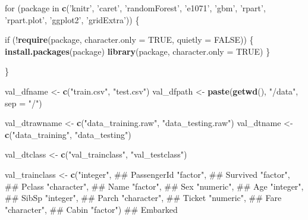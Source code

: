 \documentclass[]{article}
\newenvironment{Shaded}{\begin{snugshade}}{\end{snugshade}}
\newcommand{\KeywordTok}[1]{\textcolor[rgb]{0.13,0.29,0.53}{\textbf{{#1}}}}
\newcommand{\DataTypeTok}[1]{\textcolor[rgb]{0.13,0.29,0.53}{{#1}}}
\newcommand{\StringTok}[1]{\textcolor[rgb]{0.31,0.60,0.02}{{#1}}}
\newcommand{\OtherTok}[1]{\textcolor[rgb]{0.56,0.35,0.01}{{#1}}}
\newcommand{\NormalTok}[1]{{#1}}
\begin{document}
\begin{Shaded}
\begin{Highlighting}[]
\NormalTok{for (package in }\KeywordTok{c}\NormalTok{(}\StringTok{'knitr'}\NormalTok{, }\StringTok{'caret'}\NormalTok{, }\StringTok{'randomForest'}\NormalTok{, }\StringTok{'e1071'}\NormalTok{, }\StringTok{'gbm'}\NormalTok{, }\StringTok{'rpart'}\NormalTok{, }\StringTok{'rpart.plot'}\NormalTok{, }\StringTok{'ggplot2'}\NormalTok{, }\StringTok{'gridExtra'}\NormalTok{)) \{}
  
  \NormalTok{if (!}\KeywordTok{require}\NormalTok{(package, }\DataTypeTok{character.only =} \OtherTok{TRUE}\NormalTok{, }\DataTypeTok{quietly =} \OtherTok{FALSE}\NormalTok{)) \{}
    \KeywordTok{install.packages}\NormalTok{(package)}
    \KeywordTok{library}\NormalTok{(package, }\DataTypeTok{character.only =} \OtherTok{TRUE}\NormalTok{)}
  \NormalTok{\}}
  
\NormalTok{\}}

\NormalTok{val_dfname <-}\StringTok{ }\KeywordTok{c}\NormalTok{(}\StringTok{"train.csv"}\NormalTok{, }\StringTok{"test.csv"}\NormalTok{)}
\NormalTok{val_dfpath <-}\StringTok{ }\KeywordTok{paste}\NormalTok{(}\KeywordTok{getwd}\NormalTok{(), }\StringTok{"/data"}\NormalTok{, }\DataTypeTok{sep =} \StringTok{"/"}\NormalTok{)}

\NormalTok{val_dtrawname <-}\StringTok{ }\KeywordTok{c}\NormalTok{(}\StringTok{"data_training.raw"}\NormalTok{, }\StringTok{"data_testing.raw"}\NormalTok{)}
\NormalTok{val_dtname <-}\StringTok{ }\KeywordTok{c}\NormalTok{(}\StringTok{"data_training"}\NormalTok{, }\StringTok{"data_testing"}\NormalTok{)}

\NormalTok{val_dtclass <-}\StringTok{ }\KeywordTok{c}\NormalTok{(}\StringTok{"val_trainclass"}\NormalTok{, }\StringTok{"val_testclass"}\NormalTok{)}

\NormalTok{val_trainclass <-}\StringTok{ }\KeywordTok{c}\NormalTok{(}\StringTok{"integer"}\NormalTok{,   ## PassengerId}
                    \StringTok{"factor"}\NormalTok{,    ## Survived }
                    \StringTok{"factor"}\NormalTok{,    ## Pclass}
                    \StringTok{"character"}\NormalTok{, ## Name}
                    \StringTok{"factor"}\NormalTok{,    ## Sex}
                    \StringTok{"numeric"}\NormalTok{,   ## Age}
                    \StringTok{"integer"}\NormalTok{,   ## SibSp}
                    \StringTok{"integer"}\NormalTok{,   ## Parch}
                    \StringTok{"character"}\NormalTok{, ## Ticket}
                    \StringTok{"numeric"}\NormalTok{,   ## Fare}
                    \StringTok{"character"}\NormalTok{, ## Cabin}
                    \StringTok{"factor"}\NormalTok{)    ## Embarked}


\end{Highlighting}
\end{Shaded}
\end{document}
